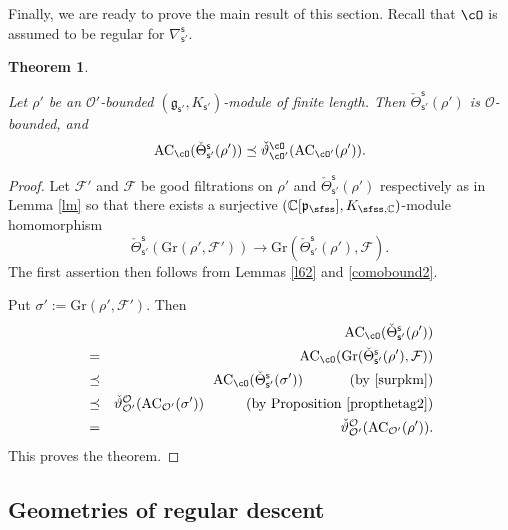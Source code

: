 \documentclass[12pt,a4paper]{amsart}
\newcommand{\CF}{{\mathcal {F}}}
\newcommand{\CO}{{\mathcal {O}}}
\newcommand{\g}{\mathfrak g}
\newcommand{\p}{\mathfrak p}
\def\DD{\nabla}
\newcommand{\be}{\begin {equation}}
\newcommand{\ee}{\end {equation}}
\numberwithin{equation}{section}
\newtheorem{thm}{Theorem}[section]
\theoremstyle{remark}
\def\UU{\rU}
\def\cOp{\cO^{\prime}}
\begin{document}
Finally, we are ready to prove the main result of this section. Recall that  $\cO$ is assumed to be  regular  for $\DD_{\mathsf s'}^{\mathsf s}$.
\begin{thm}\label{prop:GDS.AC}

  Let $\rho'$ be an $\CO'$-bounded $(\g_{\mathsf s'}, K_{\mathsf s'})$-module of finite length. Then  $\check \Theta_{\mathsf s'}^{\mathsf s}(\rho')$ is $\CO$-bounded, and
    \[
    \mathrm{AC}_{\cO}(\check \Theta_{\mathsf s'}^{\mathsf s}(\rho'))\preceq \check \vartheta_{\cO'}^\cO(\mathrm{AC}_{\cO'}(\rho')).
  \]
\end{thm}
\begin{proof}
Let $\CF'$ and $\CF$ be  good filtrations  on $\rho'$ and  $\check \Theta_{\mathsf s'}^{\mathsf s}(\rho')$ respectively as in Lemma \ref{lm} so that there exists a
 surjective $(\C[\p_{\sfss}], K_{\sfss, \C})$-module homomorphism
\be\label{surpkm}
  \check \Theta_{\mathsf s'}^{\mathsf s}(\mathrm{Gr}(\rho',\CF')) \rightarrow \mathrm{Gr}(\check \Theta_{\mathsf s'}^{\mathsf s}(\rho'),\CF).
\ee
The first assertion then follows from Lemmas \ref{l62} and \ref{comobound2}.

Put $\sigma':=\mathrm{Gr}(\rho',\CF')$.
Then
\begin{eqnarray*}
      && \mathrm{AC}_{\cO}(\check \Theta_{\mathsf s'}^{\mathsf s}(\rho'))\\
      &=&  \mathrm{AC}_{\cO}(\mathrm{Gr}(\check \Theta_{\mathsf s'}^{\mathsf s}(\rho'),\CF))\\
             &\preceq& \mathrm{AC}_{\cO}(\check \Theta_{\mathsf s'}^{\mathsf s}(\sigma')) \quad\  \qquad (\textrm{by \eqref{surpkm}})\\
          &  \preceq & \check \vartheta_{\CO'}^{\CO}(\mathrm{AC}_{\CO'}(\sigma'))\quad \qquad (\textrm{by Proposition \ref{propthetag2}})\\
               &=&\check \vartheta_{\CO'}^{\CO}(\mathrm{AC}_{\CO'}(\rho')).
               \end{eqnarray*}
This proves the theorem.
\end{proof}


\subsection{Geometries of regular descent}
\label{sec:GG}


\def\UU{{\bar \partial}}
\def\dbM{\breve{M}}
\def\dbMM{\breve{MM}}
\def\dbX{\breve{X}}
\def\dbfpp{\breve{\fpp}}
\def\ZdbX{\cZ_{\dbX}}
\def\aV{\acute{V}}
\def\fggs{\fgg_{\sfss}}
\def\fggsp{\fgg_{\sfss'}}
\def\fggspp{\fgg_{\sfss''}}
\def\fggspo{\fgg_{\sfss'_0}}
\def\fggspt{\fgg_{\sfss'_1}}
\def\fggspi{\fgg_{\sfss'_i}}
\def\fkks{\fkk_{\sfss}}
\def\fkksp{\fkk_{\sfss'}}
\def\fkkspo{\fkk_{\sfss'_0}}
\def\fkkspt{\fkk_{\sfss'_1}}
\def\fkkspi{\fkk_{\sfss'_i}}
\def\fpps{\fpp_{\sfss}}
\def\fppsp{\fpp_{\sfss'}}
\def\fppspo{\fpp_{\sfss'_0}}
\def\fppspt{\fpp_{\sfss'_1}}
\def\fppspi{\fpp_{\sfss'_i}}
\def\DDss{\DD_{\sfss'}^{\sfss}}
\def\DDsso{\DD_{\sfss'_0}^{\sfss}}
\def\cOpo{\cOp_{0}}
\def\Mss{M_{\sfss,\sfss'}}
\def\Ms{M_{\sfss}}
\def\Msp{M_{\sfss'}}
\end{document}
